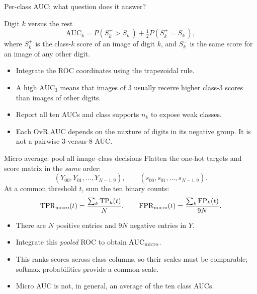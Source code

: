 \documentclass[aspectratio=169,11pt]{beamer}
\begin{document}
\begin{frame}{Per-class AUC: what question does it answer?}
\begin{block}{Digit $k$ versus the rest}
\[
 \mathrm{AUC}_k=
 P(S_k^+>S_k^-)+\tfrac12P(S_k^+=S_k^-),
\]
where $S_k^+$ is the class-$k$ score of an image of digit $k$, and
$S_k^-$ is the same score for an image of any other digit.
\end{block}
\begin{itemize}
\item Integrate the ROC coordinates using the trapezoidal rule.
\item A high $\mathrm{AUC}_3$ means that images of $3$ usually receive higher
      class-$3$ scores than images of other digits.
\item Report all ten AUCs and class supports $n_k$ to expose weak classes.
\item Each OvR AUC depends on the mixture of digits in its negative group.
      It is not a pairwise $3$-versus-$8$ AUC.
\end{itemize}
\end{frame}

\begin{frame}{Micro average: pool all image--class decisions}
Flatten the one-hot targets and score matrix in the \emph{same} order:
\[
 (Y_{00},Y_{01},\ldots,Y_{N-1,9}),\qquad
 (s_{00},s_{01},\ldots,s_{N-1,9}).
\]
At a common threshold $t$, sum the ten binary counts:
\[
 \mathrm{TPR}_{\rm micro}(t)=\frac{\sum_k\mathrm{TP}_k(t)}{N},
 \qquad
 \mathrm{FPR}_{\rm micro}(t)=\frac{\sum_k\mathrm{FP}_k(t)}{9N}.
\]
\begin{itemize}
\item There are $N$ positive entries and $9N$ negative entries in $Y$.
\item Integrate this \emph{pooled} ROC to obtain $\mathrm{AUC}_{\rm micro}$.
\item This ranks scores across class columns, so their scales must be
      comparable; softmax probabilities provide a common scale.
\item Micro AUC is not, in general, an average of the ten class AUCs.
\end{itemize}
\end{frame}
\end{document}
